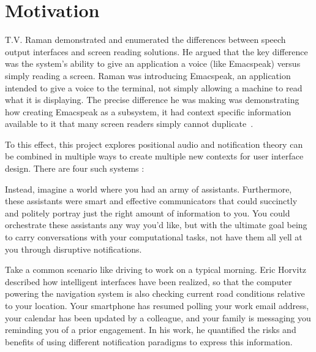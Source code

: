 \section{                  Motivation                                         }

T.V. Raman demonstrated and enumerated the differences between speech output
interfaces and screen reading solutions. He argued that the key difference
was the system's ability to give an application a voice (like Emacspeak) versus
simply reading a screen.  Raman was introducing Emacspeak, an application
intended to give a voice to the terminal, not simply allowing a machine to read
what it is displaying. The precise difference he was making was demonstrating how
creating Emacspeak as a subsystem, it had context specific information available
to it that many screen readers simply cannot duplicate~\cite{raman1996emacspeak}.

To this effect, this project explores positional audio and notification theory
can be combined in multiple ways to create multiple new contexts for user
interface design.  There are four such systems :

\textbf{}


Instead, imagine a world where you had an army of assistants. Furthermore, these
assistants were smart and effective communicators that could succinctly and
politely portray just the right amount of information to you.  You could
orchestrate these assistants any way you'd like, but with the ultimate goal
being to carry conversations with your computational tasks, not have them all
yell at you through disruptive notifications.

Take a common scenario like driving to work on a typical morning. Eric Horvitz
described how intelligent interfaces have been realized, so that the computer
powering the navigation system is also checking current road conditions relative
to your location. Your smartphone has resumed polling your work email address,
your calendar has been updated by a colleague, and your family is messaging you
reminding you of a prior engagement. In his work, he quantified the risks and
benefits of using different notification paradigms to express this information.

